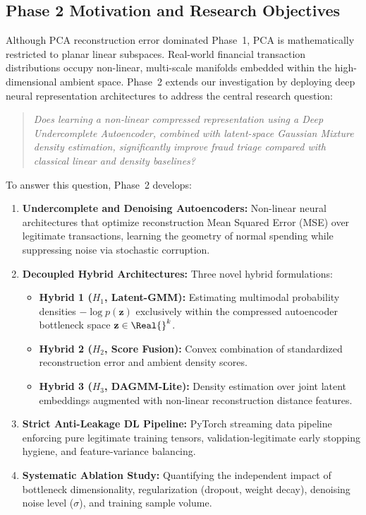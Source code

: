 \subsection{Phase 2 Motivation and Research Objectives}
\label{sec:p2_motivation}
Although PCA reconstruction error dominated Phase~1, PCA is mathematically restricted to planar linear subspaces. Real-world financial transaction distributions occupy non-linear, multi-scale manifolds embedded within the high-dimensional ambient space. Phase~2 extends our investigation by deploying deep neural representation architectures to address the central research question:
\begin{quote}
\emph{Does learning a non-linear compressed representation using a Deep Undercomplete Autoencoder, combined with latent-space Gaussian Mixture density estimation, significantly improve fraud triage compared with classical linear and density baselines?}
\end{quote}

To answer this question, Phase~2 develops:
\begin{enumerate}
    \item \textbf{Undercomplete and Denoising Autoencoders:} Non-linear neural architectures that optimize reconstruction Mean Squared Error (MSE) over legitimate transactions, learning the geometry of normal spending while suppressing noise via stochastic corruption.
    \item \textbf{Decoupled Hybrid Architectures:} Three novel hybrid formulations:
    \begin{itemize}
        \item \textbf{Hybrid 1 ($H_1$, Latent-GMM):} Estimating multimodal probability densities $-\log p(\mathbf{z})$ exclusively within the compressed autoencoder bottleneck space $\mathbf{z} \in \Real{}^k$.
        \item \textbf{Hybrid 2 ($H_2$, Score Fusion):} Convex combination of standardized reconstruction error and ambient density scores.
        \item \textbf{Hybrid 3 ($H_3$, DAGMM-Lite):} Density estimation over joint latent embeddings augmented with non-linear reconstruction distance features.
    \end{itemize}
    \item \textbf{Strict Anti-Leakage DL Pipeline:} PyTorch streaming data pipeline enforcing pure legitimate training tensors, validation-legitimate early stopping hygiene, and feature-variance balancing.
    \item \textbf{Systematic Ablation Study:} Quantifying the independent impact of bottleneck dimensionality, regularization (dropout, weight decay), denoising noise level ($\sigma$), and training sample volume.
\end{enumerate}

